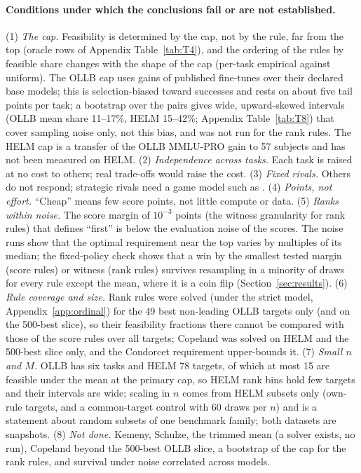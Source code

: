 \documentclass{article}
\begin{document}
\paragraph{Conditions under which the conclusions fail or are not established.}
(1) \emph{The cap.} Feasibility is determined by the cap, not by the rule, far from the top (oracle rows of Appendix Table~\ref{tab:T4}), and the ordering of the rules by feasible share changes with the shape of the cap (per-task empirical against uniform). The OLLB cap uses gains of published fine-tunes over their declared base models; this is selection-biased toward successes and rests on about five tail points per task; a bootstrap over the pairs gives wide, upward-skewed intervals (OLLB mean share 11--17\%, HELM 15--42\%; Appendix Table~\ref{tab:T8}) that cover sampling noise only, not this bias, and was not run for the rank rules. The HELM cap is a transfer of the OLLB MMLU-PRO gain to 57 subjects and has not been measured on HELM. (2) \emph{Independence across tasks.} Each task is raised at no cost to others; real trade-offs would raise the cost. (3) \emph{Fixed rivals.} Others do not respond; strategic rivals need a game model such as \citet{chen2026incentives}. (4) \emph{Points, not effort.} ``Cheap'' means few score points, not little compute or data. (5) \emph{Ranks within noise.} The score margin of $10^{-3}$ points (the witness granularity for rank rules) that defines ``first'' is below the evaluation noise of the scores. The noise runs show that the optimal requirement near the top varies by multiples of its median; the fixed-policy check shows that a win by the smallest tested margin (score rules) or witness (rank rules) survives resampling in a minority of draws for every rule except the mean, where it is a coin flip (Section~\ref{sec:results}). (6) \emph{Rule coverage and size.} Rank rules were solved (under the strict model, Appendix~\ref{app:ordinal}) for the 49 best non-leading OLLB targets only (and on the 500-best slice), so their feasibility fractions there cannot be compared with those of the score rules over all targets; Copeland was solved on HELM and the 500-best slice only, and the Condorcet requirement upper-bounds it. (7) \emph{Small $n$ and $M$.} OLLB has six tasks and HELM 78 targets, of which at most 15 are feasible under the mean at the primary cap, so HELM rank bins hold few targets and their intervals are wide; scaling in $n$ comes from HELM subsets only (own-rule targets, and a common-target control with 60 draws per $n$) and is a statement about random subsets of one benchmark family; both datasets are snapshots. (8) \emph{Not done.} Kemeny, Schulze, the trimmed mean (a solver exists, no run), Copeland beyond the 500-best OLLB slice, a bootstrap of the cap for the rank rules, and survival under noise correlated across models.
\end{document}
